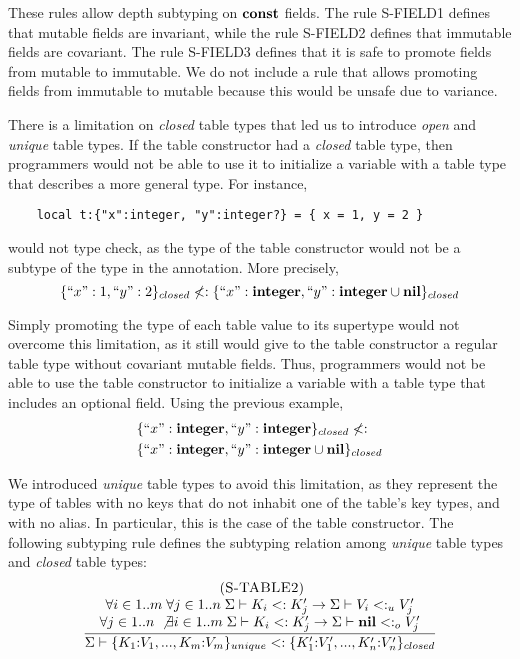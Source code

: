 These rules allow depth subtyping on $\mathbf{const}$ fields.
The rule \textsc{S-FIELD1} defines that mutable fields are invariant,
while the rule \textsc{S-FIELD2} defines that immutable fields are covariant.
The rule \textsc{S-FIELD3} defines that it is safe to promote fields
from mutable to immutable.
We do not include a rule that allows promoting fields from immutable
to mutable because this would be unsafe due to variance.

There is a limitation on \emph{closed} table types that led us to
introduce \emph{open} and \emph{unique} table types.
If the table constructor had a \emph{closed} table type, then
programmers would not be able to use it to initialize a variable with
a table type that describes a more general type.
For instance,
\begin{verbatim}
    local t:{"x":integer, "y":integer?} = { x = 1, y = 2 }
\end{verbatim}
would not type check, as the type of the table constructor would not
be a subtype of the type in the annotation.
More precisely,
\[
\{``x":1, ``y":2\}_{closed} \not<:
\{``x":\mathbf{integer}, ``y":\mathbf{integer} \cup \mathbf{nil}\}_{closed}
\]

Simply promoting the type of each table value to its supertype would
not overcome this limitation, as it still would give to the table constructor
a regular table type without covariant mutable fields.
Thus, programmers would not be able to use the table constructor to
initialize a variable with a table type that includes an optional field.
Using the previous example,
\begin{align*}
& \{``x":\mathbf{integer}, ``y":\mathbf{integer}\}_{closed} \not<: \\
& \{``x":\mathbf{integer}, ``y":\mathbf{integer} \cup \mathbf{nil}\}_{closed}
\end{align*}

We introduced \emph{unique} table types to avoid this limitation,
as they represent the type of tables with no keys that do not
inhabit one of the table's key types, and with no alias.
In particular, this is the case of the table constructor.
The following subtyping rule defines the subtyping relation among
\emph{unique} table types and \emph{closed} table types:
\[
\begin{array}{c}
\; (\textsc{S-TABLE2})\\
\dfrac{\begin{array}{c}
       \forall i \in 1..m \; \forall j \in 1..n \;
       \Sigma \vdash K_{i} <: K_{j}' \to \Sigma \vdash V_{i} <:_{u} V_{j}' \\
       \forall j \in 1..n \; \not\exists i \in 1..m \;
       \Sigma \vdash K_{i} <: K_{j}' \to \Sigma \vdash \mathbf{nil} <:_{o} V_{j}'
       \end{array}}
      {\Sigma \vdash \{K_{1}{:}V_{1}, ..., K_{m}{:}V_{m}\}_{unique} <:
                    \{K_{1}'{:}V_{1}', ..., K_{n}'{:}V_{n}'\}_{closed}}
\end{array}
\]

